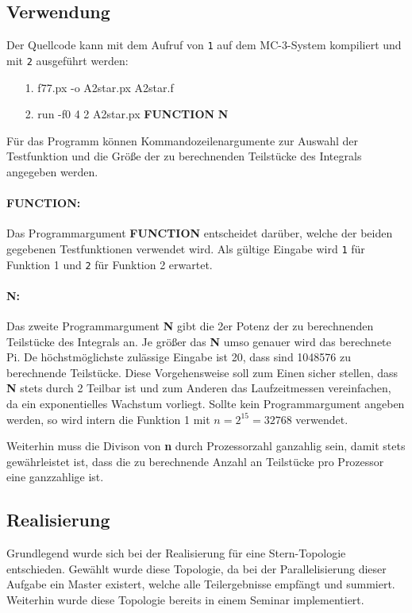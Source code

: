 \subsection{Verwendung}
\label{ref:verwendung}
Der Quellcode kann mit dem Aufruf von \texttt{1} auf dem MC-3-System kompiliert und mit \texttt{2} ausgeführt werden:
\begin{itemize}
	\item[1.] f77.px -o A2star.px A2star.f
	\item[2.] run -f0 4 2 A2star.px \textbf{FUNCTION} \textbf{N}
\end{itemize}
Für das Programm können Kommandozeilenargumente zur Auswahl der Testfunktion und die Größe der zu berechnenden Teilstücke des Integrals angegeben werden.
\paragraph{FUNCTION:}
Das Programmargument \textbf{FUNCTION} entscheidet darüber, welche der beiden gegebenen Testfunktionen verwendet wird.
Als gültige Eingabe wird \texttt{1} für Funktion 1 und \texttt{2} für Funktion 2 erwartet.
\paragraph{N:}
Das zweite Programmargument \textbf{N} gibt die 2er Potenz der zu berechnenden Teilstücke des Integrals an.
Je größer das \textbf{N} umso genauer wird das berechnete Pi.
De höchstmöglichste zulässige Eingabe ist 20, dass sind 1048576 zu berechnende Teilstücke.
Diese Vorgehensweise soll zum Einen sicher stellen, dass \textbf{N} stets durch 2 Teilbar ist und zum Anderen das Laufzeitmessen vereinfachen, da ein exponentielles Wachstum vorliegt.
Sollte kein Programmargument angeben werden, so wird intern die Funktion 1 mit $n = 2^{15} = 32768$ verwendet.

Weiterhin muss die Divison von \textbf{n} durch Prozessorzahl ganzahlig sein, damit stets gewährleistet ist, dass die zu berechnende Anzahl an Teilstücke pro Prozessor eine ganzzahlige ist.

\subsection{Realisierung}
\label{ref:realisierung}
Grundlegend wurde sich bei der Realisierung für eine Stern-Topologie entschieden.
Gewählt wurde diese Topologie, da bei der Parallelisierung dieser Aufgabe ein Master existert, welche alle Teilergebnisse empfängt und summiert.
Weiterhin wurde diese Topologie bereits in einem Seminar implementiert.

